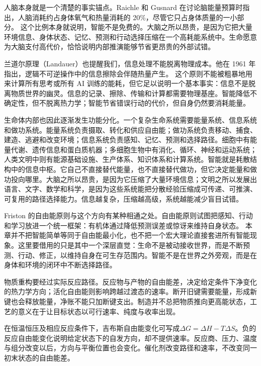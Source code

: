 人脑本身就是一个清楚的事实锚点。Raichle 和 Gusnard 在讨论脑能量预算时指出，人脑消耗约占身体氧气和热量消耗的 20\%，尽管它只占身体质量的一小部分。\cite{raichle2002} 这个比例本身就说明，智能不是免费的。大脑之所以昂贵，是因为它把大量环境信息、身体状态、记忆、预测和行动选择压缩在一个高耗能系统中。生命愿意为大脑支付高代价，恰恰说明内部推演能够节省更昂贵的外部试错。

兰道尔原理（Landauer）也提醒我们，信息处理不能脱离物理成本。他在 1961 年指出，逻辑不可逆操作中的信息擦除会伴随热量产生。\cite{landauer1961} 这个原则不能被粗暴地用来计算所有思考或所有 AI 训练的能耗，但它足以说明一个基本事实：信息不是脱离物质世界的幽灵。信息的记录、擦除、传输和计算都需要物理基座。智能降低不确定性，但不脱离热力学；智能节省错误行动的代价，但自身仍然要消耗能量。

生命体内部也因此逐渐发生功能分化。一个复杂生命系统需要能量系统、信息系统和做功系统。能量系统负责摄取、转化和供应自由能；做功系统负责移动、捕食、建造、逃避和改变环境；信息系统负责感知、记忆、预测和选择路径。细胞中有能量代谢、遗传信息和蛋白质机器；多细胞生物中有消化、循环、神经和运动系统；人类文明中则有能源基础设施、生产体系、知识体系和计算系统。智能就是耗散结构中的信息中枢。它自己不直接替代能量，也不直接替代做功，但它决定能量和做功投向哪里。大脑之所以昂贵，是因为它压缩了大量环境信息；文明之所以发展出语言、文字、数学和科学，是因为这些系统能把分散经验压缩成可传递、可推演、可复用的路径选择能力。信息越复杂，压缩越高级，系统越能减少盲目试错。

Friston 的自由能原则与这个方向有某种相通之处。自由能原则试图把感知、行动和学习放进一个统一框架：有机体通过降低预测误差或惊讶来维持自身状态。\cite{friston2010} 本章并不把智能简单等同于自由能最小化，也不把一个宏大理论直接套进所有智能现象。这里要借用的只是其中一个深层直觉：生命不是被动接收世界，而是不断预测、行动、修正，以维持自身在可生存范围内。智能不是在世界之外旁观，而是在身体和环境的闭环中不断选择路径。


物质重构要经过实际反应路径。反应物与产物的自由能差，决定给定条件下净变化的热力学方向；活化自由能则影响跨越过渡态的速率。断开旧键需要能量，形成新键也会释放能量，净账不能只加断键支出。制造并不总把物质推向更高能状态，工艺的意义在于让目标状态以可行速率、纯度与收率出现。

在恒温恒压及相应反应条件下，吉布斯自由能变化可写成$\Delta G=\Delta H-T\Delta S$。负的反应自由能变化说明给定状态下的自发方向，却不提供速率。反应商、压力、温度与组分改变以后，方向与平衡位置也会变化。催化剂改变路径和速率，不改变同一初末状态的自由能差。

